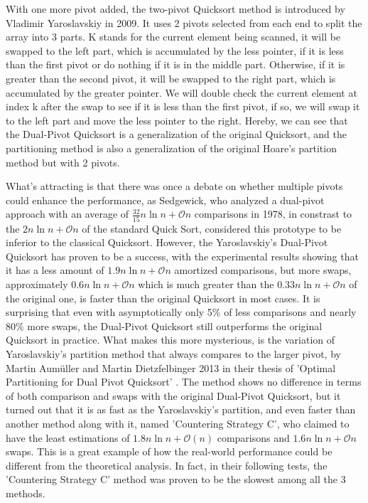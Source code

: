 \documentclass{article}
\newcommand{\bigO}{\mathcal{O}}
\begin{document}
With one more pivot added, the two-pivot Quicksort method is introduced by Vladimir Yaroslavskiy in 2009. It uses 2 pivots selected from each end to split the array into 3 parts.
K stands for the current element being scanned, it will be swapped to the left part, which is accumulated by the less pointer, if it is less than the first pivot or do nothing if it is in the middle part.
Otherwise, if it is greater than the second pivot, it will be swapped to the right part, which is accumulated by the greater pointer.
We will double check the current element at index k after the swap to see if it is less than the first pivot, if so, we will swap it to the left part and move the less pointer to the right.
Hereby, we can see that the Dual-Pivot Quicksort is a generalization of the original Quicksort, and the partitioning method is also a generalization of the original Hoare's partition method but with 2 pivots.

What's attracting is that there was once a debate on whether multiple pivots could enhance the performance, as Sedgewick,
who analyzed a dual-pivot approach with an average of $\frac{32}{15}n \ln n + \bigO{n}$ comparisons in 1978, in constrast to the $2n\ln n + \bigO{n}$ of the standard Quick Sort, considered this prototype to be inferior to the classical Quicksort.
However, the Yaroslavskiy's Dual-Pivot Quicksort has proven to be a success, with the experimental results showing that it has a less amount of $1.9n\ln n + \bigO{n}$ amortized comparisons, but more swaps,
approximately $0.6n\ln n + \bigO{n}$ which is much greater than the $0.33n\ln n + \bigO{n}$ of the original one, is faster than the original Quicksort in most cases.
It is surprising that even with asymptotically only 5\% of less comparisons and nearly 80\% more swaps, the Dual-Pivot Quicksort still outperforms the original Quicksort in practice.
What makes this more mysterious, is the variation of Yaroslavskiy's partition method that always compares to the larger pivot, by Martin Aumüller and Martin Dietzfelbinger 2013 in their thesis of 'Optimal Partitioning for Dual Pivot Quicksort' \cite{OptimalPartitioningForDualPivotQuicksort}.
The method shows no difference in terms of both comparison and swaps with the original Dual-Pivot Quicksort, but it turned out that it is as fast as the Yaroslavskiy's partition, and even faster than another method along with it, named 'Countering Strategy C', who claimed to have the least 
estimations of $1.8n \ln n + \bigO(n)$ comparisons and $1.6n \ln n + \bigO{n}$ swaps. This is a great example of how the real-world performance could be different from the theoretical analysis. In fact, in their following tests, the 'Countering Strategy C' method was proven to be the slowest among all the 3 methods.
\end{document}
